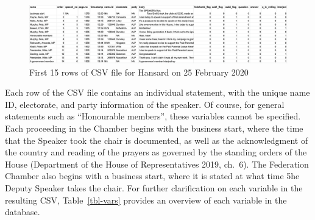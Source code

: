 \documentclass[
  letterpaper,
  DIV=11,
  numbers=noendperiod]{scrartcl}
\begin{document}
\begin{figure}

{\centering \includegraphics{main_ex15.png}

}

\caption{\label{fig-main15rows}First 15 rows of CSV file for Hansard on
25 February 2020}

\end{figure}

Each row of the CSV file contains an individual statement, with the
unique name ID, electorate, and party information of the speaker. Of
course, for general statements such as ``Honourable members'', these
variables cannot be specified. Each proceeding in the Chamber begins
with the business start, where the time that the Speaker took the chair
is documented, as well as the acknowledgment of the country and reading
of the prayers as governed by the standing orders of the House
(Department of the House of Representatives 2019, ch.~6). The Federation
Chamber also begins with a business start, where it is stated at what
time 5he Deputy Speaker takes the chair. For further clarification on
each variable in the resulting CSV, Table~\ref{tbl-vars} provides an
overview of each variable in the database.
\end{document}

